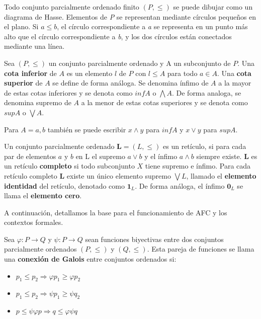 \documentclass[../../main.tex]{subfiles}
\begin{document}
Todo conjunto parcialmente ordenado finito $(P,\leq)$ se puede dibujar como un diagrama de Hasse. Elementos de \textit{P} se representan mediante círculos pequeños en el plano. Si $a \leq b$, el círculo correspondiente a \textit{a} se representa en un punto más alto que el círculo correspondiente a \textit{b}, y los dos círculos están conectados mediante una línea. 


\begin{definicion}
Sea $(P,\leq)$ un conjunto parcialmente ordenado y A un subconjunto de $P$. Una \textbf{cota inferior} de $A$ es un elemento $l$ de $P$ con $l \leq A$ para todo $a \in A$. Una \textbf{cota superior} de $A$ se define de forma análoga. Se denomina ínfimo de $A$ a la mayor de estas cotas inferiores y se denota como $inf A$ o $\bigwedge A$. De forma analoga, se denomina supremo de $A$ a la menor de estas cotas superiores y se denota como $sup A$ o $\bigvee A$.
\end{definicion}

Para $A = {a,b}$ también se puede escribir $x \wedge y$ para $inf A$ y $x \vee y$ para $sup A$.


\begin{definicion}
Un conjunto parcialmente ordenado $\textbf{L} = (L, \leq)$ es un retículo, si para cada par de elementos $a$ y $b$ en L el supremo $a \vee b$ y el ínfimo $a \wedge b$ siempre existe. $\textbf{L}$ es un retículo \textbf{completo} si todo subconjunto $X$ tiene supremo e ínfimo. Para cada retículo completo $\textbf{L}$ existe un único elemento supremo $\bigvee L$, llamado el \textbf{elemento identidad} del retículo, denotado como $\textbf{1}_L$. De forma análoga, el ínfimo $\textbf{0}_L$ se llama el \textbf{elemento cero}.
\end{definicion}

A continuación, detallamos la base para el funcionamiento de AFC y los contextos formales.

\begin{definicion}
Sea $\varphi : P \rightarrow Q$ y $\psi : P \rightarrow Q$ sean funciones biyectivas entre dos conjuntos parcialmente ordenados $(P,\leq)$ y $(Q,\leq)$. Esta pareja de funciones se llama una \textbf{conexión de Galois} entre conjuntos ordenados si:
\begin{itemize}
    \item $p_1 \leq p_2 \Longrightarrow \varphi p_1 \geq \varphi p_2$
    \item $p_1 \leq p_2 \Longrightarrow \psi p_1 \geq \psi q_2$
    \item $p \leq \psi \varphi p \Longrightarrow q \leq \varphi \psi q$
\end{itemize}
\end{definicion}
\end{document}
